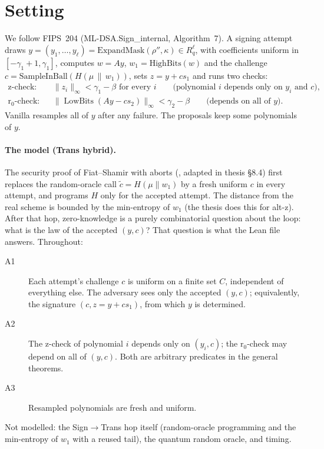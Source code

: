 \documentclass[11pt]{article}
\theoremstyle{definition}
\theoremstyle{remark}
\newcommand{\lowbits}{\operatorname{LowBits}}
\begin{document}
\section{Setting}\label{sec:setting}

We follow FIPS~204 (ML-DSA.Sign\_internal, Algorithm~7). A signing attempt draws
$y=(y_1,\dots,y_\ell) = \mathrm{ExpandMask}(\rho'',\kappa) \in R_q^\ell$, with coefficients
uniform in $[-\gamma_1+1,\gamma_1]$, computes $w = Ay$, $w_1 = \mathrm{HighBits}(w)$ and the
challenge $c = \mathrm{SampleInBall}(H(\mu\,\|\,w_1))$, sets $z = y + c s_1$ and runs two checks:
\begin{align*}
\text{z-check:}\quad & \|z_i\|_\infty < \gamma_1-\beta \text{ for every } i
  \qquad\text{(polynomial $i$ depends only on $y_i$ and $c$)},\\
\text{r$_0$-check:}\quad & \|\lowbits(Ay - c s_2)\|_\infty < \gamma_2 - \beta
  \qquad\text{(depends on all of $y$)}.
\end{align*}
Vanilla resamples all of $y$ after any failure. The proposals keep some polynomials of $y$.

\paragraph{The model (Trans hybrid).} The security proof of Fiat--Shamir with aborts
(\cite{BBDD23}, adapted in thesis \S8.4) first replaces the random-oracle call $\tilde c = H(\mu\|w_1)$ by
a fresh uniform $c$ in every attempt, and programs $H$ only for the accepted attempt. The
distance from the real scheme is bounded by the min-entropy of $w_1$ (the thesis does this for
alt-z). After that hop, zero-knowledge is a purely combinatorial question about the loop: what is
the law of the accepted $(y,c)$? That question is what the Lean file answers. Throughout:

\begin{description}
\item[A1] Each attempt's challenge $c$ is uniform on a finite set $C$, independent of everything
  else. The adversary sees only the accepted $(y,c)$; equivalently, the signature
  $(c, z=y+cs_1)$, from which $y$ is determined.
\item[A2] The z-check of polynomial $i$ depends only on $(y_i,c)$; the r$_0$-check may depend on
  all of $(y,c)$. Both are arbitrary predicates in the general theorems.
\item[A3] Resampled polynomials are fresh and uniform.
\end{description}
Not modelled: the Sign$\to$Trans hop itself (random-oracle programming and the min-entropy of
$w_1$ with a reused tail), the quantum random oracle, and timing.
\end{document}
